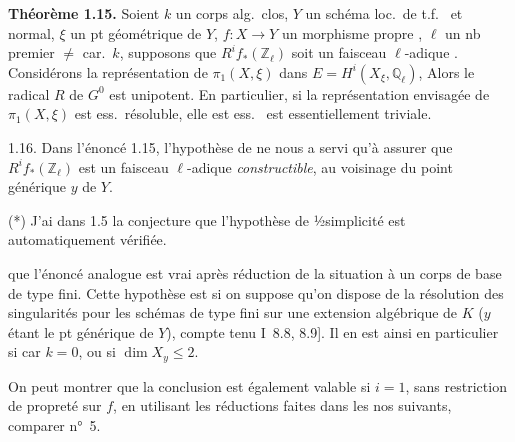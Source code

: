 \documentclass[11pt,a4paper]{article}
\begin{document}
\textbf{Théorème 1.15.} Soient $k$ un corps alg.\ clos, $Y$ un schéma  loc.\ de t.f.\  et normal, $\xi$ un pt géométrique \struck{\ill{}} de $Y$, $f \colon X \to Y$ un morphisme propre \struck{\ill{}} \struck{\ill{}} \add{\ill{}}, $\ell$ un nb premier $\neq$ car.~$k$,  supposons que  $R^i f_*(\mathbb{Z}_\ell)$ soit un faisceau $\ell$-adique . Considérons la représentation de $\pi_1(X,\xi)$ dans $E = H^i(X_\xi, \mathbb{Q}_\ell)$,  Alors le radical $R$ de $G^0$ est unipotent.  En particulier, si  la représentation envisagée de $\pi_1(X,\xi)$ est ess.\ résoluble, elle est ess.\ \struck{\ill{}}   est essentiellement triviale.

1.16. Dans l'énoncé 1.15, l'hypothèse de  ne nous a servi qu'à assurer que  $R^i f_*(\mathbb{Z}_\ell)$ est un faisceau $\ell$-adique \emph{constructible}, au voisinage du point générique $y$ de $Y$.

(*) J'ai \struck{\ill{}} \ill{} dans 1.5 la conjecture que  l'hypothèse de ½simplicité est automatiquement vérifiée.

\ill{} que l'énoncé analogue est vrai après réduction de la situation à un corps de base de type fini. Cette hypothèse est   si on suppose qu'on dispose de la résolution des singularités pour les schémas de type fini  sur une extension algébrique de $K$ ($y$ étant le pt générique de $Y$),  compte tenu I~8.8, 8.9]. Il en est ainsi en particulier si car $k = 0$, ou si $\dim X_y \leq 2$.

On peut montrer que la conclusion est également valable si $i = 1$, sans restriction \struck{\ill{}} de propreté sur $f$,  en utilisant les réductions faites dans les nos suivants, comparer n°~5.
\end{document}
